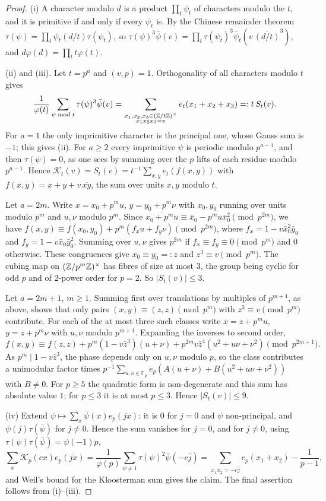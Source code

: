 \documentclass[11pt,colorlinks]{charlie}
\newcommand{\F}{\mathbb{F}}
\begin{document}
\begin{proof}
(i) A character modulo $d$ is a product $\prod_t\psi_t$ of characters modulo the $t$, and it is primitive if and only if every $\psi_t$ is. By the Chinese remainder theorem $\tau(\psi)=\prod_t\psi_t(d/t)\tau(\psi_t)$, so $\tau(\psi)^3\bar\psi(v)=\prod_t\tau(\psi_t)^3\bar\psi_t(v\,\overline{(d/t)}^3)$, and $d\varphi(d)=\prod_tt\varphi(t)$.

(ii) and (iii). Let $t=p^a$ and $(v,p)=1$. Orthogonality of all characters modulo $t$ gives
\[
 \frac1{\varphi(t)}\sum_{\psi\bmod t}\tau(\psi)^3\bar\psi(v)=\sum_{\substack{x_1,x_2,x_3\in(\mathbb{Z}/t\mathbb{Z})^\times\\x_1x_2x_3=v}}e_t(x_1+x_2+x_3)=:t\,S_t(v).
\]
For $a=1$ the only imprimitive character is the principal one, whose Gauss sum is $-1$; this gives (ii). For $a\ge2$ every imprimitive $\psi$ is periodic modulo $p^{a-1}$, and then $\tau(\psi)=0$, as one sees by summing over the $p$ lifts of each residue modulo $p^{a-1}$. Hence $\mathscr K_t(v)=S_t(v)=t^{-1}\sum_{x,y}e_t(f(x,y))$ with $f(x,y)=x+y+v\,\overline{xy}$, the sum over units $x,y$ modulo $t$.

Let $a=2m$. Write $x=x_0+p^mu$, $y=y_0+p^m\nu$ with $x_0,y_0$ running over units modulo $p^m$ and $u,\nu$ modulo $p^m$. Since $\overline{x_0+p^mu}\equiv\bar x_0-p^mu\bar x_0^2\pmod{p^{2m}}$, we have $f(x,y)\equiv f(x_0,y_0)+p^m(f_xu+f_y\nu)\pmod{p^{2m}}$, where $f_x=1-v\bar x_0^2\bar y_0$ and $f_y=1-v\bar x_0\bar y_0^2$. Summing over $u,\nu$ gives $p^{2m}$ if $f_x\equiv f_y\equiv0\pmod{p^m}$ and $0$ otherwise. These congruences give $x_0\equiv y_0=:z$ and $z^3\equiv v\pmod{p^m}$. The cubing map on $(\mathbb{Z}/p^m\mathbb{Z})^\times$ has fibres of size at most $3$, the group being cyclic for odd $p$ and of $2$-power order for $p=2$. So $|S_t(v)|\le3$.

Let $a=2m+1$, $m\ge1$. Summing first over translations by multiples of $p^{m+1}$, as above, shows that only pairs $(x,y)\equiv(z,z)\pmod{p^m}$ with $z^3\equiv v\pmod{p^m}$ contribute. For each of the at most three such classes write $x=z+p^mu$, $y=z+p^m\nu$ with $u,\nu$ modulo $p^{m+1}$. Expanding the inverses to second order,
\[
 f(x,y)\equiv f(z,z)+p^m(1-v\bar z^3)(u+\nu)+p^{2m}v\bar z^4(u^2+u\nu+\nu^2)\pmod{p^{2m+1}}.
\]
As $p^m\mid1-v\bar z^3$, the phase depends only on $u,\nu$ modulo $p$, so the class contributes a unimodular factor times $p^{-1}\sum_{u,\nu\in\F_p}e_p(A(u+\nu)+B(u^2+u\nu+\nu^2))$ with $B\ne0$. For $p\ge5$ the quadratic form is non-degenerate and this sum has absolute value $1$; for $p\le3$ it is at most $p\le3$. Hence $|S_t(v)|\le9$.

(iv) Extend $\psi\mapsto\sum_x\bar\psi(x)e_p(jx)$: it is $0$ for $j=0$ and $\psi$ non-principal, and $\psi(j)\tau(\bar\psi)$ for $j\ne0$. Hence the sum vanishes for $j=0$, and for $j\ne0$, using $\tau(\psi)\tau(\bar\psi)=\psi(-1)p$,
\[
 \sum_x\mathscr K_p(cx)e_p(jx)=\frac1{\varphi(p)}\sum_{\psi\ne1}\tau(\psi)^2\bar\psi(-c\bar j)=\sum_{x_1x_2=-c\bar j}e_p(x_1+x_2)-\frac1{p-1},
\]
and Weil's bound for the Kloosterman sum gives the claim. The final assertion follows from (i)--(iii).
\end{proof}
\end{document}
